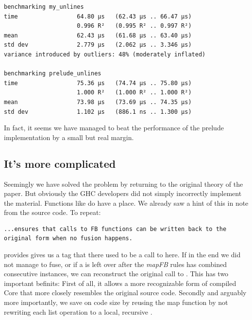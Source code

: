 \begin{listing}[H]
\begin{verbatim}
benchmarking my_unlines
time                 64.80 μs   (62.43 μs .. 66.47 μs)
                     0.996 R²   (0.995 R² .. 0.997 R²)
mean                 62.43 μs   (61.68 μs .. 63.40 μs)
std dev              2.779 μs   (2.062 μs .. 3.346 μs)
variance introduced by outliers: 48% (moderately inflated)

benchmarking prelude_unlines
time                 75.36 μs   (74.74 μs .. 75.80 μs)
                     1.000 R²   (1.000 R² .. 1.000 R²)
mean                 73.98 μs   (73.69 μs .. 74.35 μs)
std dev              1.102 μs   (886.1 ns .. 1.300 μs)
\end{verbatim}
\end{listing}

In fact, it seems we have managed to beat the performance of the prelude implementation by a small but real margin.

\subsection{It's more complicated}
\label{section:results:unlines:conclusion}

Seemingly we have solved the problem by returning to the original theory of the paper. But obviously the GHC developers did not simply
incorrectly implement the material. Functions like  do have a place. We already saw a hint of this in note from the source
code. To repeat:

\begin{listing}[H]
\begin{verbatim}
...ensures that calls to FB functions can be written back to the original form when no fusion happens.
\end{verbatim}
\end{listing}

 provides gives us a tag that there used to be a call to  here. If in the end we did not manage to fuse,
or if a  is left over after the \textit{mapFB} rules has combined consecutive instances, we can reconstruct the original
call to . This has two important befinits: First of all, it allows a more recognizable form of compiled Core that more closely
resembles the original source code. Secondly and arguably more importantly, we save on code size by reusing the map function by not
rewriting each list operation to a local, recursive .

